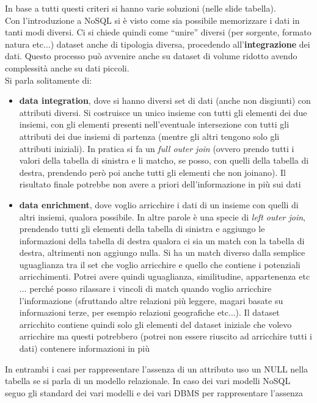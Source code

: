 \documentclass[a4paper,12pt, oneside]{book}
\begin{document}
In base a tutti questi criteri si hanno varie soluzioni (nelle slide tabella).\\
Con l'introduzione a NoSQL si è visto come sia possibile memorizzare i dati in
tanti modi diversi. Ci si chiede quindi come ``unire'' diversi (per sorgente,
formato natura etc$\ldots$) dataset anche di tipologia diversa, procedendo
all'\textbf{integrazione} dei dati. Questo processo può avvenire anche su
dataset di volume ridotto avendo complessità anche su dati piccoli.\\
Si parla solitamente di:
\begin{itemize}
  \item \textbf{data integration}, dove si hanno diversi set di dati (anche non
  disgiunti) con attributi diversi. Si costruisce un unico insieme con tutti gli
  elementi dei due insiemi, con gli elementi presenti nell'eventuale
  intersezione con tutti gli attributi dei due insiemi di partenza (mentre gli
  altri tengono solo gli attributi iniziali). In pratica si fa un \textit{full
    outer join} (ovvero prendo tutti i valori della tabella di sinistra e li
  matcho, se posso, con quelli della tabella di destra, prendendo però poi anche
  tutti gli elementi che non joinano). Il risultato finale potrebbe non avere a
  priori dell'informazione in più sui dati
  \item \textbf{data enrichment}, dove voglio arricchire i dati di un insieme
  con quelli di altri insiemi, qualora possibile. In altre parole è una specie
  di \textit{left outer join}, prendendo tutti gli elementi della tabella di
  sinistra e aggiungo le informazioni della tabella di destra qualora ci sia un
  match con la tabella di destra, altrimenti non aggiungo nulla. Si ha un
  match diverso dalla semplice uguaglianza tra il set che voglio arricchire e
  quello che contiene i potenziali arricchimenti. Potrei avere quindi
  uguaglianza, similitudine, appartenenza etc$\ldots$ perché posso rilassare i
  vincoli di match quando voglio arricchire l'informazione (sfruttando altre
  relazioni più leggere, magari basate su informazioni terze, per esempio
  relazioni geografiche etc$\ldots$). Il dataset arricchito contiene quindi solo
  gli elementi del dataset iniziale che volevo arricchire ma questi potrebbero
  (potrei non essere riuscito ad arricchire tutti i dati) contenere informazioni
  in più
\end{itemize}
In entrambi i casi per rappresentare l'assenza di un attributo uso un NULL nella
tabella se si parla di un modello relazionale. In caso dei vari modelli NoSQL
seguo gli standard dei vari modelli e dei vari DBMS per rappresentare l'assenza
\end{document}
